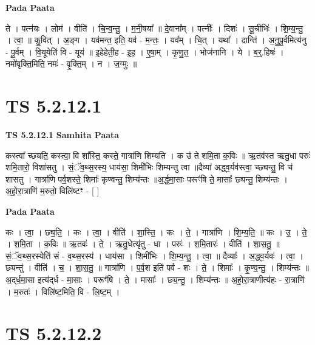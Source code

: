 \documentclass[17pt]{extarticle}
\begin{document}
\textbf{Pada Paata} \newline

ते । पत्न॑यः । लोम॑ । वीति॑ । चि॒न्व॒न्तु॒ । म॒नी॒षया᳚ ॥ दे॒वाना᳚म् । पत्नीः᳚ । दिशः॑ । सू॒चीभिः॑ । शि॒म्य॒न्तु॒ । त्वा॒ ॥ कु॒वित् । अ॒ङ्ग । यव॑मन्त॒ इति॒ यव॑ - म॒न्तः॒ । यव᳚म् । चि॒त् । यथा᳚ । दान्ति॑ । अ॒नु॒पू॒र्वमित्य॑नु - पू॒र्वम् । वि॒यूयेति॑ वि - यूय॑ ॥ इ॒हेहेती॒ह - इ॒ह॒ । ए॒षा॒म् । कृ॒णु॒त॒ । भोज॑नानि । ये । ब॒र्॒.हिषः॑ । नमो॑वृक्ति॒मिति॒ नमः॑ - वृ॒क्ति॒म् । न । ज॒ग्मुः ॥  \newline




\section*{ TS 5.2.12.1 }

\textbf{TS 5.2.12.1 } \newline
\textbf{Samhita Paata} \newline

कस्त्वा᳚ च्छ्यति॒ कस्त्वा॒ वि शा᳚स्ति॒ कस्ते॒ गात्रा॑णि शिम्यति । क उ॑ ते शमि॒ता क॒विः ॥ ऋ॒तव॑स्त ऋतु॒धा परुः॑ शमि॒तारो॒ विशा॑सतु । सं॒ॅव॒थ्स॒रस्य॒ धाय॑सा॒ शिमी॑भिः शिम्यन्तु त्वा ॥दैव्या॑ अद्ध्व॒र्यव॑स्त्वा॒ च्छ्यन्तु॒ वि च॑ शासतु । गात्रा॑णि पर्व॒शस्ते॒ शिमाः᳚ कृण्वन्तु॒ शिम्य॑न्तः ॥अ॒र्द्ध॒मा॒साः परूꣳ॑षि ते॒ मासाः᳚ छ्यन्तु॒ शिम्य॑न्तः । अ॒हो॒रा॒त्राणि॑ म॒रुतो॒ विलि॑ष्टꣳ - [  ] \newline

\textbf{Pada Paata} \newline

कः । त्वा॒ । छ्य॒ति॒ । कः । त्वा॒ । वीति॑ । शा॒स्ति॒ । कः । ते॒ । गात्रा॑णि । शि॒म्य॒ति॒ ॥ कः । उ॒ । ते॒ । श॒मि॒ता । क॒विः ॥ ऋ॒तवः॑ । ते॒ । ऋ॒तु॒धेत्यृ॑तु - धा । परुः॑ । श॒मि॒तारः॑ । वीति॑ । शा॒स॒तु॒ ॥ सं॒ॅव॒थ्स॒रस्येति॑ सं - व॒थ्स॒रस्य॑ । धाय॑सा । शिमी॑भिः । शि॒म्य॒न्तु॒ । त्वा॒ ॥ दैव्याः᳚ । अ॒द्ध्व॒र्यवः॑ । त्वा॒ । छ्यन्तु॑ । वीति॑ । च॒ । शा॒स॒तु॒ ॥ गात्रा॑णि । प॒र्व॒श इति॑ पर्व - शः । ते॒ । शिमाः᳚ । कृ॒ण्व॒न्तु॒ । शिम्य॑न्तः ॥ अ॒द्‌र्ध॒मा॒सा इत्य॑द्‌र्ध - मा॒साः । परूꣳ॑षि । ते॒ । मासाः᳚ । छ्य॒न्तु॒ । शिम्य॑न्तः ॥ अ॒हो॒रा॒त्राणीत्य॑हः - रा॒त्राणि॑ । म॒रुतः॑ । विलि॑ष्ट॒मिति॒ वि - लि॒ष्ट॒म् ।  \newline




\section*{ TS 5.2.12.2 }
\end{document}
